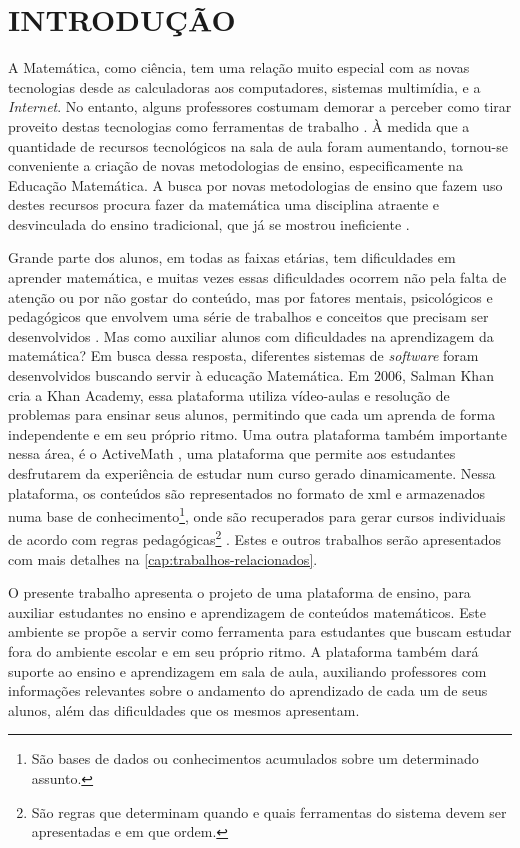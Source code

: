 \chapter{INTRODUÇÃO}
\label{cap:introducao}

A Matemática, como ciência, tem uma relação muito especial com as novas tecnologias desde as calculadoras aos computadores, sistemas 
multim\'idia, e a \textit{Internet}. No entanto, alguns professores costumam demorar a perceber como tirar proveito destas tecnologias como 
ferramentas de trabalho \cite{da1997ensino}. \`A medida que a quantidade de recursos tecnológicos na sala de aula foram aumentando, 
tornou-se conveniente a criação de novas metodologias de ensino, especificamente na Educação Matemática. A busca por novas 
metodologias de ensino que fazem uso destes recursos procura fazer da matemática uma disciplina atraente e desvinculada do ensino 
tradicional, que já se mostrou ineficiente \cite{silva2009ambiente}.

Grande parte dos alunos, em todas as faixas etárias, tem dificuldades em aprender matemática, e muitas vezes essas dificuldades ocorrem não pela falta de atenção ou por não gostar do conteúdo, mas por fatores mentais, psicológicos e pedag\'ogicos que envolvem uma série de trabalhos e conceitos que precisam ser desenvolvidos \cite{de2006dificuldades}. Mas como auxiliar alunos com dificuldades na aprendizagem da matemática? Em busca dessa resposta, diferentes sistemas de \textit{software} foram desenvolvidos buscando servir \`a  educação Matem\'atica. Em 2006, Salman Khan cria a Khan Academy, essa plataforma utiliza vídeo-aulas e resolução de problemas para ensinar seus alunos, permitindo que cada um aprenda de forma independente e em seu pr\'oprio ritmo. Uma outra plataforma também  importante nessa área, \'e o ActiveMath \cite{melis2001activemath}, uma plataforma que permite aos estudantes desfrutarem da experiência de estudar num curso gerado dinamicamente. Nessa plataforma, os conte\'udos s\~ao representados no formato de \gls{xml} \cite{bray1998extensible} e armazenados numa base de conhecimento\footnote{São bases de dados ou conhecimentos acumulados sobre um determinado assunto.}, onde s\~ao recuperados para gerar cursos individuais de acordo com regras 
pedagógicas\footnote{S\~ao regras que determinam quando e quais ferramentas do sistema devem ser apresentadas e em que ordem.} 
\cite{melis2004activemath}. Estes e outros trabalhos serão apresentados com mais detalhes na \autoref{cap:trabalhos-relacionados}.

O presente trabalho apresenta o projeto de uma plataforma de ensino, para auxiliar 
estudantes no ensino e aprendizagem de conteúdos matemáticos. Este ambiente se propõe a servir como ferramenta para estudantes que buscam 
estudar fora do ambiente escolar e em seu próprio ritmo. A plataforma também dará suporte ao ensino e aprendizagem em sala de aula, 
auxiliando professores com informações relevantes sobre o andamento do aprendizado de cada um de seus alunos, além das dificuldades que os 
mesmos apresentam.

